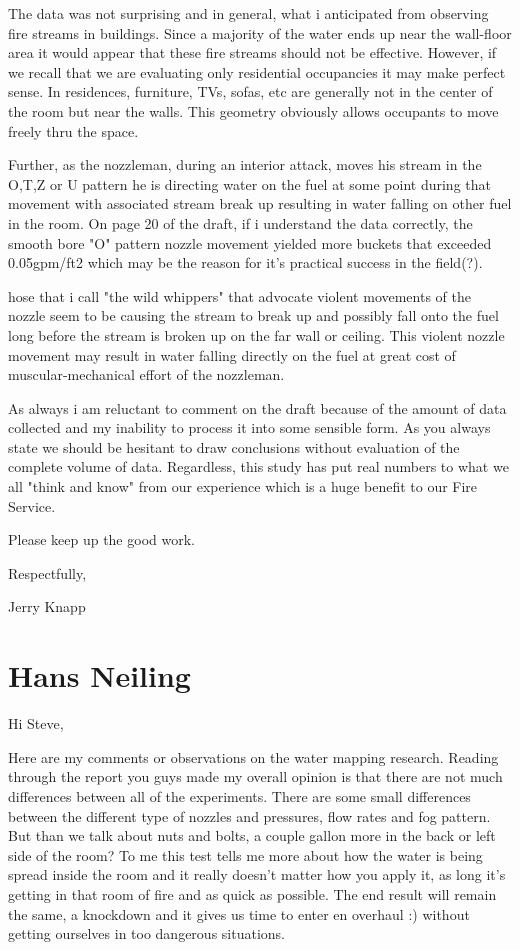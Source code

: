 \documentclass[12pt,oneside]{book}
\begin{document}
\begin{appendix}
The data was not surprising and in general, what i anticipated from observing fire streams in buildings. Since a majority of the water ends up near the wall-floor area it would appear that these fire streams should not be effective.  However, if we recall that we are evaluating only residential occupancies it may make perfect sense.  In residences, furniture, TVs, sofas, etc are generally not in the center of the room but near the walls.  This geometry obviously allows occupants to move freely thru the space.  
 
Further, as the nozzleman, during an interior attack, moves his stream in the O,T,Z or U pattern he is directing water on the fuel at some point during that movement with associated stream break up resulting in water falling on other fuel in the room.  On page 20 of the draft, if i understand the data correctly, the smooth bore "O" pattern nozzle movement yielded more buckets that exceeded 0.05gpm/ft2 which may be the reason for it's practical success in the field(?).
 
 hose that i call "the wild whippers" that advocate violent movements of the nozzle seem to be causing the stream to break up and possibly fall onto the fuel long before the stream is broken up on the far wall or ceiling.  This violent nozzle movement may result in water falling directly on the fuel at great cost of muscular-mechanical effort of the nozzleman.
 
As always i am reluctant to comment on the draft because of the amount of data collected and my inability to process it into some sensible form.  As you always state we should be hesitant to draw conclusions without evaluation of the complete volume of data.  Regardless, this study has put real numbers to what we all "think and know" from our experience which is a huge benefit to our Fire Service.
 
Please keep up the good work.
 
Respectfully,
 
Jerry Knapp

\section{Hans Neiling}

Hi Steve,
 
Here are my comments or observations on the water mapping research. Reading through the report you guys made my overall opinion is that there are not much differences between all of the experiments. There are some small differences between the different type of nozzles and pressures, flow rates and fog pattern. But than we talk about nuts and bolts, a couple gallon more in the back or left side of the room? To me this test tells me more about how the water is being spread inside the room and it really doesn’t matter how you apply it, as long it’s getting in that room of fire and as quick as possible. The end result will remain the same, a knockdown and it gives us time to enter en overhaul :) without getting ourselves in too dangerous situations.
 

\end{appendix}
\end{document}

